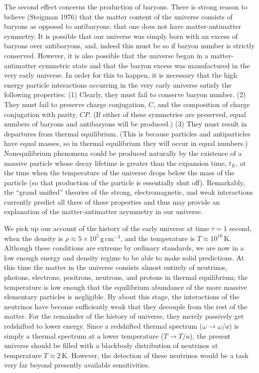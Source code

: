 The second effect concerns the production of baryons. There is strong reason to
believe (Steigman 1976) that the matter content of the universe consists of baryons
as opposed to antibaryons; that one does not have matter-antimatter symmetry. It is
possible that our universe was simply born with an excess of baryons over antibaryons,
and, indeed this must be so if baryon number is strictly conserved. However, it is
also possible that the universe began in a matter-antimatter symmetric state and that
the baryon excess was manufactured in the very early universe. In order for this to
happen, it is necessary that the high energy particle interactions occurring in the very
early universe satisfy the following properties: (1) Clearly, they must fail to conserve
baryon number. (2) They must fail to preserve charge conjugation, \(C\), and the
composition of charge conjugation with parity, \(CP\). (If either of these symmetries
are preserved, equal numbers of baryons and antibaryons will be produced.) (3) They
must result in departures from thermal equilibrium. (This is because particles and
antiparticles have equal masses, so in thermal equilibrium they will occur in equal
numbers.) Nonequilibrium phenomena could be produced naturally by the existence of
a massive particle whose decay lifetime is greater than the expansion time, \(t_E\), at
the time when the temperature of the universe drops below the mass of the particle
(so that production of the particle is essentially shut off). Remarkably, the ``grand
unified'' theories of the strong, electromagnetic, and weak interactions currently
predict all three of these properties and thus may provide an explanation of the
matter-antimatter asymmetry in our universe.

We pick up our account of the history of the early universe at time \(\tau=1\) second,
when the density is \(\rho\approx5\times10^5\,\mathrm{g\,cm^{-3}}\), and the
temperature is \(T\approx10^{10}\,\mathrm{K}\). Although these conditions are extreme
by ordinary standards, we are now in a low enough energy and density regime to be
able to make solid predictions. At this time the matter in the universe consists almost
entirely of neutrinos, photons, electrons, positrons, neutrons, and protons in thermal
equilibrium; the temperature is low enough that the equilibrium abundance of the more
massive elementary particles is negligible. By about this stage, the interactions of the
neutrinos have become sufficiently weak that they decouple from the rest of the matter.
For the remainder of the history of universe, they merely passively get redshifted to
lower energy. Since a redshifted thermal spectrum (\(\omega\to\omega/a\)) is simply a
thermal spectrum at a lower temperature (\(T\to T/a\)), the present universe should
be filled with a blackbody distribution of neutrinos at temperature \(T\approx2\,\mathrm{K}\).
However, the detection of these neutrinos would be a task very far beyond presently
available sensitivities.

